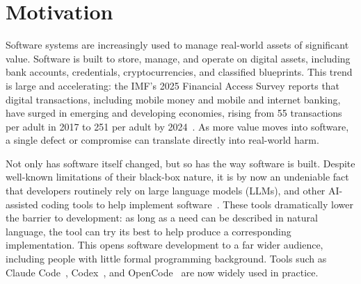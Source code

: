 \section{Motivation}
\label{sec:motivation}

Software systems are increasingly used to manage real-world
assets of significant value. Software is built to store, manage,
and operate on digital assets, including 
bank accounts, credentials, cryptocurrencies, and classified blueprints.
This trend is large and
accelerating: the IMF's 2025 Financial 
Access Survey reports that
digital transactions, including mobile 
money and mobile and internet
banking, have surged in emerging and 
developing economies, rising
from 55 transactions per adult in 2017 to 251 per adult by
2024~\cite{imf2025fas}. As more value 
moves into software, a single
defect or compromise can translate directly into 
real-world harm.

Not only has software itself changed, but so 
has the way
software is built. Despite well-known
limitations of their black-box nature,
it is by now an
undeniable fact that developers 
routinely rely on large language models (LLMs),
and other AI-assisted coding
tools to help implement
software~\cite{liang2024largescale, 
barke2023grounded}.
These 
tools dramatically lower the
barrier to development: as long as a 
need can be described in natural
language, the tool can try its best to 
help produce a 
corresponding implementation.
This opens software development to a far wider audience, including
people with little formal programming 
background. Tools such as Claude
Code~\cite{anthropic_claude_code}, Codex~\cite{openai_codex_2026}, and
OpenCode~\cite{opencode_2026} are now widely 
used in practice. 


